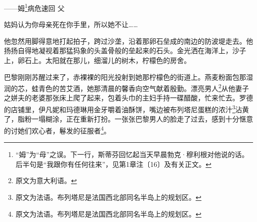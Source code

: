 \par ——姆\footnote{“姆”为“母”之误。下一行，斯蒂芬回忆起当天早晨勃克·穆利根对他说的话。后半句是“我跟你有任何往来”，见第1章注〔16〕及有关正文。}病危速回 父
\par 姑妈认为你母亲死在你手里，所以她不让……
\par 他忽然用脚得意地打起拍子，跨过沙垄，沿着那卵石垒成的南边的防波堤走去。他扬扬自得地凝视着那猛犸象的头盖骨般的垒起来的石头。金光洒在海洋上，沙子上，卵石上。太阳就在那儿，细溜儿的树木，柠檬色的房舍。
\par 巴黎刚刚苏醒过来了，赤裸裸的阳光投射到她那柠檬色的街道上。燕麦粉面包那湿润的芯，蛙青色的苦艾酒，她那清晨的馨香向空气献着殷勤。漂亮男人\footnote{原文为意大利语。}从他妻子之姘夫的老婆那张床上爬了起来，包着头巾的主妇手持一碟醋酸，忙来忙去。罗德的店铺里，伊凡妮和玛德琳用金牙嚼着油酥饼，嘴边被布列塔尼蛋糕的浓汁\footnote{原文为法语。布列塔尼是法国西北部同名半岛上的规划区。}沾黄了，脂粉一塌糊涂，正在重新打扮。一张张巴黎男人的脸走了过去，感到十分惬意的讨她们欢心者，鬈发的征服者\footnote{原文为法语。布列塔尼是法国西北部同名半岛上的规划区。}。
